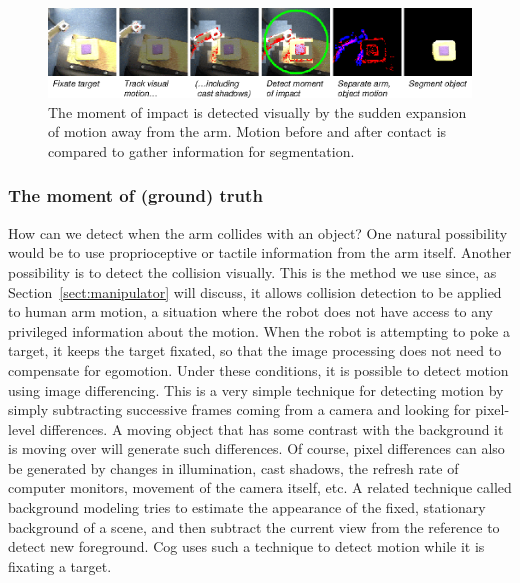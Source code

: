 
\begin{figure}[tbh]
  \begin{center}
\includegraphics[width=\columnwidth]{fig-poke-zoom.eps}
  \end{center}
  \caption{
  \label{fig:poke-zoom}
    The moment of impact is detected visually by the
    sudden expansion of motion away from the arm.  Motion before and
    after contact is compared to gather information for segmentation.
}
\end{figure}


\subsubsection*{The moment of (ground) truth}

How can we detect when the arm collides with an object?  One natural
possibility would be to use proprioceptive or tactile information from
the arm itself.  Another possibility is to detect the collision
visually.  This is the method we use since, as
Section~\ref{sect:manipulator} will discuss, it allows collision
detection to be applied to human arm motion, a situation where the robot
does not have access to any privileged information about the motion.  When the robot 
is attempting to poke a target, it keeps the target fixated,
so that the image processing does not need to compensate for
egomotion.
Under these conditions, it is possible to detect motion using
image differencing.
This is a very simple technique for detecting motion by
simply subtracting successive frames coming from a camera and looking for
pixel-level differences.  A moving object that has some contrast with
the background it is moving over will generate such differences.  Of
course, pixel differences can also be generated by changes in
illumination, cast shadows, the refresh rate of computer monitors, movement of the camera
itself, etc.  A related technique called background modeling tries to
estimate the appearance of the fixed, stationary background of a 
scene, and then subtract the current view from the reference to 
detect new foreground.  Cog uses such a technique to detect motion
while it is fixating a target.


